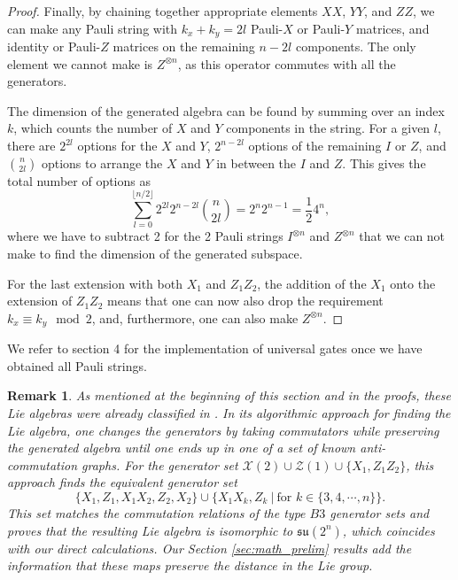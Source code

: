 \documentclass[12pt, a4-paper]{amsart}
\newcommand{\cX}{\mathcal{X}}
\newcommand{\cZ}{\mathcal{Z}}
\numberwithin{equation}{section}
\newtheorem{rem}[lemma]{Remark}
\begin{document}
\begin{proof}
    Finally, by chaining together appropriate elements $XX$, $YY$, and $ZZ$, we can make any Pauli string with $k_x+k_y = 2l$ Pauli-$X$ or Pauli-$Y$ matrices, and identity or Pauli-$Z$ matrices on the remaining $n-2l$ components. The only element we cannot make is $Z^{\otimes n}$, as this operator commutes with all the generators.

    The dimension of the generated algebra can be found by summing over an index $k$, which counts the number of $X$ and $Y$ components in the string. For a given $l$, there are $2^{2l}$ options for the $X$ and $Y$, $2^{n-2l}$ options of the remaining $I$ or $Z$, and $\binom{n}{2l}$ options to arrange the $X$ and $Y$ in between the $I$ and $Z$. This gives the total number of options as
    \begin{equation}
        \sum_{l=0}^{\lfloor n/2 \rfloor } 2^{2l} 2^{n-2l} \binom{n}{2l} = 2^n 2^{n-1} = \frac12 4^n,
    \end{equation}
    where we have to subtract 2 for the 2 Pauli strings $I^{\otimes n}$ and $Z^{\otimes n}$ that we can not make to find the dimension of the generated subspace.

    For the last extension with both $X_1$ and $Z_1 Z_2$, the addition of the $X_1$ onto the extension of $Z_1 Z_2$ means that one can now also drop the requirement $k_x \equiv k_y \mod{2}$, and, furthermore, one can also make $Z^{\otimes n}$.
\end{proof}

We refer to section 4 for the implementation of universal gates once we have obtained all Pauli strings.

\begin{rem}\label{rem:Eisert_classification}
    As mentioned at the beginning of this section and in the proofs, these Lie algebras were already classified in \cite{Aguilar2024FullClassificationLie}. In  its algorithmic approach for finding the Lie algebra, one changes the generators by taking commutators while preserving the generated algebra until one ends up in one of a set of known anti-commutation graphs. For the generator set $\cX(2) \cup \cZ(1) \cup \{X_1, Z_1Z_2\}$, this approach finds the equivalent generator set
    \begin{equation}
        \{X_1, Z_1, X_1X_2, Z_2, X_2\} \cup \{X_1 X_k, Z_k ~|~ \text{for } k \in \{3,4,\cdots, n\}\}.
    \end{equation}
    This set matches the commutation relations of the type $B3$ generator sets and proves that the resulting Lie algebra is isomorphic to $\mathfrak{su}(2^n)$, which coincides with our direct calculations. Our Section \ref{sec:math_prelim} results add the information that these maps preserve the distance in the Lie group.
\end{rem}
\end{document}
